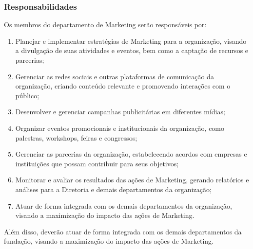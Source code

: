         \subsubsection{Responsabilidades}
            Os membros do departamento de Marketing serão responsáveis por:
            \begin{enumerate}
                \item  Planejar e implementar estratégias de Marketing para a organização, visando a divulgação de suas atividades e eventos, bem como a captação de recursos e parcerias;
                \item Gerenciar as redes sociais e outras plataformas de comunicação da organização, criando conteúdo relevante e promovendo interações com o público;
                \item Desenvolver e gerenciar campanhas publicitárias em diferentes mídias;
                \item Organizar eventos promocionais e institucionais da organização, como palestras, workshops, feiras e congressos;
                \item Gerenciar as parcerias da organização, estabelecendo acordos com empresas e instituições que possam contribuir para seus objetivos;
                \item Monitorar e avaliar os resultados das ações de Marketing, gerando relatórios e análises para a Diretoria e demais departamentos da organização;
                \item Atuar de forma integrada com os demais departamentos da organização, visando a maximização do impacto das ações de Marketing.
            \end{enumerate}
             Além disso, deverão atuar de forma integrada com os demais departamentos da fundação, visando a maximização do impacto das ações de Marketing.
